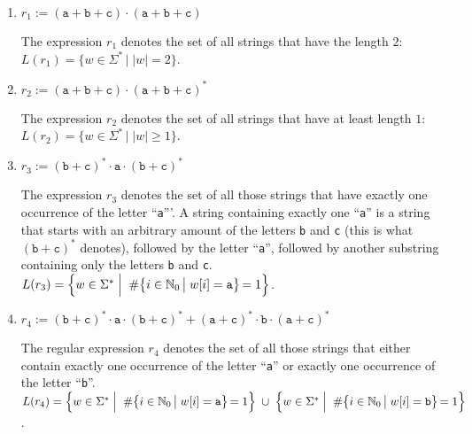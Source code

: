 \begin{enumerate}
\item $r_1 := (\texttt{a} + \texttt{b} + \texttt{c}) \cdot (\texttt{a} + \texttt{b} + \texttt{c})$

      The expression  $r_1$ denotes the set of all strings that have the length $2$:
      \\[0.2cm]
      \hspace*{1.3cm}
      $L(r_1) = \bigl\{ w \in \Sigma^* \,\big|\; |w| = 2 \bigr\}$.
\item $r_2 := (\texttt{a} + \texttt{b} + \texttt{c}) \cdot (\texttt{a} + \texttt{b} + \texttt{c})^*$

      The expression  $r_2$ denotes the set of all strings that have at least length $1$:
      \\[0.2cm]
      \hspace*{1.3cm}
      $L(r_2) = \bigl\{ w \in \Sigma^* \,\big|\; |w| \geq 1 \bigr\}$.
\item $r_3 := (\texttt{b} + \texttt{c})^* \cdot \texttt{a} \cdot 
              (\texttt{b} + \texttt{c})^*$

      The expression $r_3$ denotes the set of all those strings that have exactly one occurrence of
      the letter ``\texttt{a}'''.  A string containing exactly one ``\texttt{a}''
      is a string that starts with an arbitrary amount of the letters \texttt{b} and \texttt{c} 
      (this is what $(\texttt{b} + \texttt{c})^*$ denotes), followed by the letter ``\texttt{a}'',
      followed by another substring containing only the letters \texttt{b} and \texttt{c}.
      \\[0.2cm]
      \hspace*{1.3cm}
      $L(r_3) = \Bigl\{ w \in \Sigma^* \;\Big|\;\; 
                        \#\bigl\{i \in  \mathbb{N}_0 \,\big|\; w[i] = \texttt{a} \bigl\} \,= 1 \Bigr\}$.
\item $r_4 :=  (\texttt{b} + \texttt{c})^* \cdot \texttt{a} \cdot (\texttt{b} + \texttt{c})^* +
               (\texttt{a} + \texttt{c})^* \cdot \texttt{b} \cdot (\texttt{a} + \texttt{c})^*$

      The regular expression $r_4$ denotes the set of all those strings that either contain exactly
      one occurrence of the letter ``\texttt{a}'' or exactly one occurrence of the letter ``\texttt{b}''.
      \\[0.2cm]
      \hspace*{0.3cm}
      $L(r_4) = \Bigl\{ w \in \Sigma^* \;\Big|\;\; 
                        \#\bigl\{i \in \mathbb{N}_0 \,\big|\; w[i] = \texttt{a} \bigl\} \,=
                        1 \Bigr\} \;\cup\;
                \Bigl\{ w \in \Sigma^* \;\Big|\;\; 
                        \#\bigl\{i \in \mathbb{N}_0 \,\big|\; w[i] = \texttt{b} \bigl\} \,=
                        1 \Bigr\}$.  \eox 
\end{enumerate}

